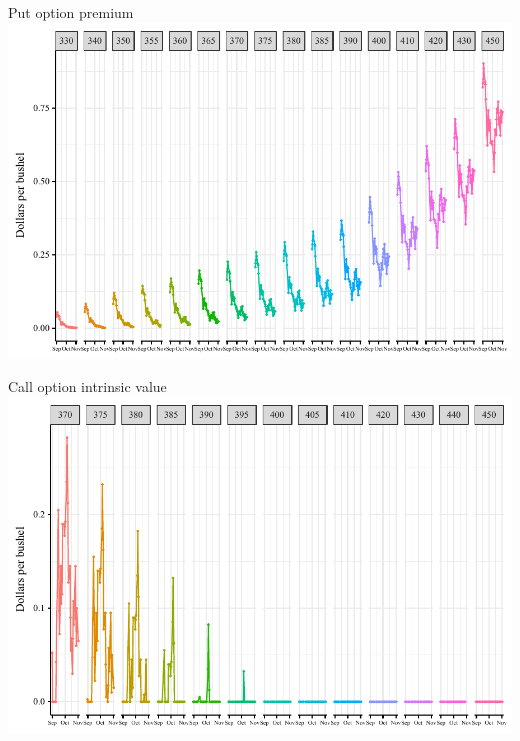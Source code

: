 \documentclass[table,xcolor=pdftex,dvipsnames]{beamer}\usepackage[]{graphicx}\usepackage[]{color}
\makeatletter
\def\maxwidth{ %
  \ifdim\Gin@nat@width>\linewidth
    \linewidth
  \else
    \Gin@nat@width
  \fi
}
\newenvironment{knitrout}{}{} %
\makeatother
\begin{document}

\begin{frame}{Put option premium}
\begin{knitrout}
\color{fgcolor}
\includegraphics[width=\maxwidth]{figure/put_premium-1} 

\end{knitrout}
\end{frame}


\begin{frame}{Call option intrinsic value}
\begin{knitrout}
\color{fgcolor}
\includegraphics[width=\maxwidth]{figure/call_intrinsic-1} 

\end{knitrout}
\end{frame}
\end{document}
